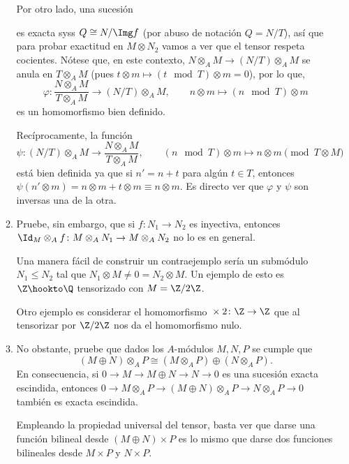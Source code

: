 \documentclass[11pt, reqno]{amsart}
\begin{document}
\begin{enumerate}
\begin{enumerate}
\begin{sol}
					Por otro lado, una sucesión 
					es exacta syss $Q \cong N/\Img f$ (por abuso de notación $Q = N/T$), así que
					para probar exactitud en $M\otimes N_2$ vamos a ver que el tensor respeta
					cocientes.
					Nótese que, en este contexto, $N \otimes_A M \to (N/T)\otimes_A M$ se anula en
					$T\otimes_A M$ (pues $t\otimes m \mapsto (t\mod T)\otimes m = 0$), por lo que,
					\[
						\varphi \colon \frac{N\otimes_A M}{T\otimes_A M} \longrightarrow
						(N/T)\otimes_A M, \qquad n\otimes m \longmapsto (n\mod T)\otimes m
					\]
					es un homomorfismo bien definido.

					Recíprocamente, la función
					\[
						\psi \colon (N/T)\otimes_A M \longrightarrow \frac{N\otimes_A
						M}{T\otimes_A M}, \qquad
						(n\mod T)\otimes m \longmapsto n\otimes m \pmod{T\otimes M}
					\]
					está bien definida ya que si $n' = n + t$ para algún $t \in T$, entonces
					$\psi(n'\otimes m) = n\otimes m + t\otimes m \equiv n\otimes m$.
					Es directo ver que $\varphi$ y $\psi$ son inversas una de la otra.
				\end{sol}

			\item Pruebe, sin embargo, que si $f \colon N_1 \to N_2$ es inyectiva, entonces $\Id_M\otimes_A
				f \colon M\otimes_A N_1 \to M\otimes_A N_2$ no lo es en general.

				\begin{sol}
					Una manera fácil de construir un contraejemplo sería un submódulo $N_1 \le N_2$
					tal que $N_1 \otimes M \ne 0 = N_2 \otimes M$.
					Un ejemplo de esto es $\Z \hookto \Q$ tensorizado con $M = \Z/2\Z$.

					Otro ejemplo es considerar el homomorfismo ${}\times 2 \colon \Z \to \Z$ que al
					tensorizar por $\Z/2\Z$ nos da el homomorfismo nulo.
				\end{sol}

			\item No obstante, pruebe que dados los $A$-módulos $M, N, P$ se cumple que
				\[
					(M \oplus N)\otimes_A P \cong (M\otimes_A P)\oplus(N\otimes_A P).
				\]
				En consecuencia, si $0 \to M \to M\oplus N \to N \to 0$ es una sucesión exacta escindida,
				entonces $0 \to M\otimes_A P \to (M\oplus N)\otimes_A P \to N\otimes_A P \to 0$ también
				es exacta escindida.

				\begin{sol}
					Empleando la propiedad universal del tensor, basta ver que darse una función
					bilineal desde $(M\oplus N)\times P$ es lo mismo que darse dos funciones
					bilineales desde $M\times P$ y $N\times P$.


\end{sol}
\end{enumerate}
\end{enumerate}
\end{document}
